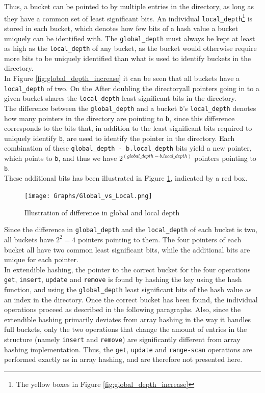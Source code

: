\documentclass[11pt]{article} %
\begin{document}
Thus, a bucket can be pointed to by multiple entries in the directory, as long as they have a common set of least significant bits. An individual \verb|local_depth|\footnote{The yellow boxes in Figure \ref{fig:global_depth_increase}} is stored in each bucket, which denotes how few bits of a hash value a bucket uniquely can be identified with. The \verb|global_depth| must always be kept at least as high as the \verb|local_depth| of any bucket, as the bucket would otherwise require more bits to be uniquely identified than what is used to identify buckets in the directory. \\

In Figure \ref{fig:global_depth_increase} it can be seen that all buckets have a \verb|local_depth| of two. On the After doubling the directoryall pointers going in to a given bucket shares the \verb|local_depth| least significant bits in the directory. \\

The difference between the \verb|global_depth| and a bucket \verb|b|'s \verb|local_depth| denotes how many pointers in the directory are pointing to \verb|b|, since this difference corresponds to the bits that, in addition to the least significant bits required to uniquely identify \verb|b|, are used to identify the pointer in the directory. Each combination of these \verb|global_depth - b.local_depth| bits yield a new pointer, which points to \verb|b|, and thus we have $2^{(global\_depth-b.local\_depth)}$ pointers pointing to \verb|b|. \\

These additional bits has been illustrated in Figure \ref{fig:global_vs_local}, indicated by a red box. 
\begin{figure}[H]
  \centering
  \texttt{[image: Graphs/Global\_vs\_Local.png]}
  \caption{Illustration of difference in global and local depth}
  \label{fig:global_vs_local}
\end{figure}
Since the difference in \verb|global_depth| and the \verb|local_depth| of each bucket is two, all buckets have $2^2 = 4$ pointers pointing to them. The four pointers of each bucket all have two common least significant bits, while the additional bits are unique for each pointer.\\

In extendible hashing, the pointer to the correct bucket for the four operations \verb|get|, \verb|insert|, \verb|update| and \verb|remove| is found by hashing the key using the hash function, and using the \verb|global_depth| least significant bits of the hash value as an index in the directory. Once the correct bucket has been found, the individual operations proceed as described in the following paragraphs. Also, since the extendible hashing primarily deviates from array hashing in the way it handles full buckets, only the two operations that change the amount of entries in the structure (namely \verb|insert| and \verb|remove|) are significantly different from array hashing implementation. Thus, the \verb|get|, \verb|update| and \verb|range-scan| operations are performed exactly as in array hashing, and are therefore not presented here.
\end{document}
